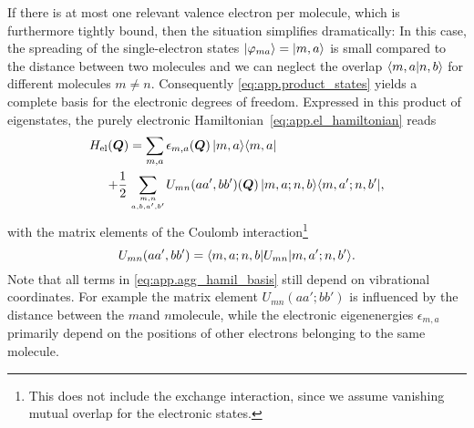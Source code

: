 If there is at most one relevant valence electron per molecule, which is furthermore tightly bound, then the situation simplifies dramatically:
In this case, the spreading of the single-electron states $| \varphi_{ma} \rangle = | m, a \rangle$ is small compared to the distance between two molecules and we can neglect the overlap $\langle m, a | n, b \rangle$ for different molecules $m \neq n$.
Consequently \autoref{eq:app.product_states} yields a complete basis for the electronic degrees of freedom.
Expressed in this product of eigenstates, the purely electronic Hamiltonian~\ref{eq:app.el_hamiltonian} reads
\begin{align}
  H_\mathrm{el}(\boldsymbol{Q}) = \sum_{m, a}\, &\epsilon_{m, a}(\boldsymbol{Q}) \, | m, a \rangle\langle m, a | \nonumber\\
  + \frac{1}{2}\sum_{m,n \atop a,b,a',b'} &U_{mn}(aa', bb')(\boldsymbol{Q}) \, | m,a; n,b \rangle\langle m,a'; n,b' |,
  \label{eq:app.agg_hamil_basis}
\end{align}
with the matrix elements of the Coulomb interaction\footnote{%
  This does not include the exchange interaction, since we assume vanishing mutual overlap for the electronic states.
}
\begin{equation*}
  U_{mn}(aa', bb') = \langle m,a; n,b | U_{mn} | m,a'; n,b' \rangle.
\end{equation*}
Note that all terms in \autoref{eq:app.agg_hamil_basis} still depend on vibrational coordinates.
For example the matrix element $U_{mn}(aa'; bb')$ is influenced by the distance between the $m$\th and $n$\th molecule, while the electronic eigenenergies $\epsilon_{m, a}$ primarily depend on the positions of other electrons belonging to the same molecule.\\



%

